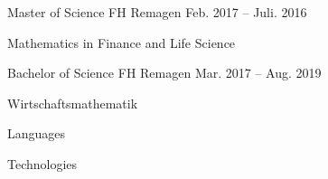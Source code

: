 \documentclass[10pt, a4paper]{customcv}
\begin{document}
\begin{multicols}{2}
\begin{cventries}
  \end{cventries}


  \begin{cventries}
    \cventry
      {Master of Science}
      {FH Remagen}
      {Feb. 2017 – Juli. 2016}
      {
        \begin{cvitems}
          \item {Mathematics in Finance and Life Science}
        \end{cvitems}
      }

    \cventry
      {Bachelor of Science}
      {FH Remagen}
      {Mar. 2017 – Aug. 2019}
      {
        \begin{cvitems}
          \item {Wirtschaftsmathematik}
        \end{cvitems}
      }

  \end{cventries}

  \vfill\null
  \columnbreak


  \skillgroup
    {Languages}
    {
          
        
    }

  \skillgroup
    {Technologies}
    {
          
        
    }

  \contactinfo

  \end{multicols}
\end{document}
